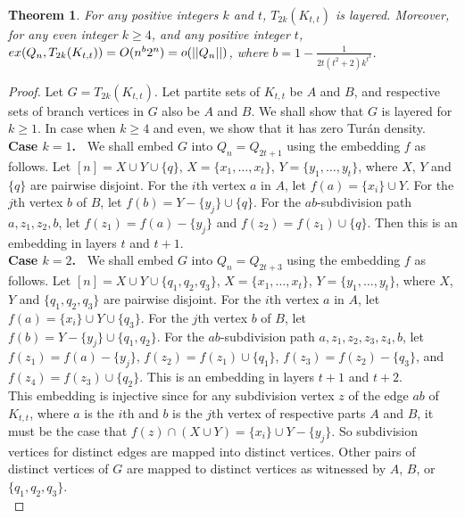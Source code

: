 \documentclass[11pt, a4paper]{article}
\newtheorem{theorem}{Theorem}
\newcommand{\ex}{{\rm  ex}}
\begin{document}
		
		
	
\begin{theorem}\label{complete-bipartite}
For any positive integers $k$ and $t$, $T_{2k}(K_{t,t})$  is layered.
Moreover, for any even integer $k\geq 4$, and any positive integer $t$, 
$\ex(Q_n, T_{2k}(K_{t,t})) = O( n^{b}2^n) = o(||Q_n||)$, where $b= 1 -\frac{1}{2t(t^2+2)k^{t^2}}$.
\end{theorem}		

		
\begin{proof}
Let $G= T_{2k}(K_{t,t})$. Let partite sets of $K_{t,t}$ be $A$ and $B$,  and respective  sets of branch vertices in $G$ also be $A$ and $B$.  We shall show that $G$ is layered for $k\geq 1$. In case when $k\geq 4$ and even, we show that it has zero Tur\'an density.\\

\noindent
{\bf Case $k=1$.~}  We shall embed $G$ into $Q_n= Q_{2t+1}$ using the embedding $f$ as follows. Let $[n]= X\cup Y\cup \{q\}$, $X=\{x_1, \ldots, x_t\}$, 
$Y=\{y_1, \ldots, y_{t}\}$, where $X$, $Y$ and $\{q\}$ are pairwise disjoint. For the $i$th vertex  $a$ in $A$, let $f(a) = \{x_i\} \cup Y$.
For the $j$th vertex $b$ of $B$, let $f(b) = Y-\{y_j\} \cup \{q\}$. 
For the $ab$-subdivision path $a, z_1, z_2, b$, let $f(z_1) = f(a) - \{y_j\}$ and $f(z_2) = f(z_1) \cup \{q\}$. 
Then this is an embedding in layers $t$ and $t+1$. \\



\noindent
{\bf Case $k=2$.~}  We shall embed $G$ into $Q_n= Q_{2t+3}$ using the embedding $f$ as follows. Let $[n]= X\cup Y\cup \{q_1, q_2, q_3\}$, $X=\{x_1, \ldots, x_t\}$, 
$Y=\{y_1, \ldots, y_{t}\}$, where $X$, $Y$ and $\{q_1, q_2, q_3\}$ are pairwise disjoint. For the $i$th vertex  $a$ in $A$, let $f(a) = \{x_i\} \cup Y \cup \{q_3\}$.
For the $j$th vertex $b$ of $B$, let $f(b) = Y-\{y_j\} \cup \{q_1, q_2\}$. 
For the $ab$-subdivision path $a, z_1, z_2, z_3, z_4, b$, let $f(z_1) = f(a) - \{y_j\}$, $f(z_2) = f(z_1) \cup \{q_1\}$, 
$f(z_3) = f(z_2) - \{q_3\}$, and $f(z_4) = f(z_3) \cup \{q_2\}$. 
This is an embedding in layers $t+1$ and $t+2$.\\

This embedding is injective since for  any subdivision vertex $z$ of the edge $ab$ of $K_{t,t}$, where $a$ is the $i$th and $b$ is the $j$th vertex of respective parts $A$ and $B$, it must be the case that  $f(z)\cap (X\cup Y) = \{x_i\} \cup Y- \{y_j\}$. So subdivision vertices for distinct edges are mapped into distinct vertices.  Other pairs of distinct vertices of $G$ are mapped to distinct vertices as witnessed by $A$, $B$, or $\{q_1, q_2, q_3\}$. \\







\end{proof}
\end{document}
